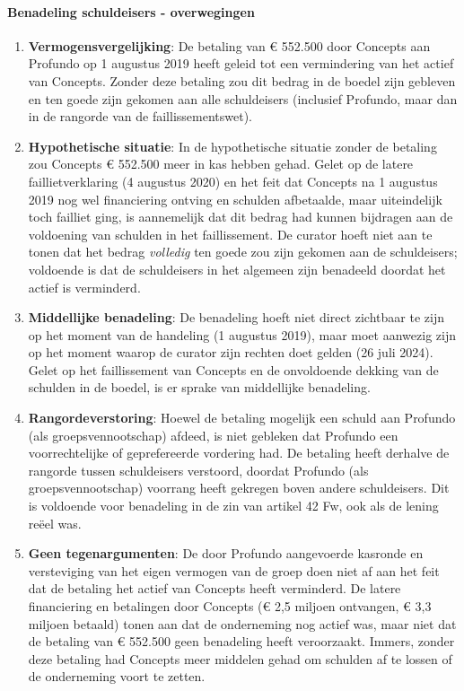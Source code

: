 \documentclass[
  dutch,
  a4paper,
]{article}
\begin{document}
\paragraph{Benadeling schuldeisers - overwegingen}\label{benadeling-schuldeisers---overwegingen-36}

\begin{enumerate}
\def\labelenumi{\arabic{enumi}.}
\item
  \textbf{Vermogensvergelijking}: De betaling van € 552.500 door Concepts aan Profundo op 1 augustus 2019 heeft geleid tot een vermindering van het actief van Concepts. Zonder deze betaling zou dit bedrag in de boedel zijn gebleven en ten goede zijn gekomen aan alle schuldeisers (inclusief Profundo, maar dan in de rangorde van de faillissementswet).
\item
  \textbf{Hypothetische situatie}: In de hypothetische situatie zonder de betaling zou Concepts € 552.500 meer in kas hebben gehad. Gelet op de latere faillietverklaring (4 augustus 2020) en het feit dat Concepts na 1 augustus 2019 nog wel financiering ontving en schulden afbetaalde, maar uiteindelijk toch failliet ging, is aannemelijk dat dit bedrag had kunnen bijdragen aan de voldoening van schulden in het faillissement. De curator hoeft niet aan te tonen dat het bedrag \emph{volledig} ten goede zou zijn gekomen aan de schuldeisers; voldoende is dat de schuldeisers in het algemeen zijn benadeeld doordat het actief is verminderd.
\item
  \textbf{Middellijke benadeling}: De benadeling hoeft niet direct zichtbaar te zijn op het moment van de handeling (1 augustus 2019), maar moet aanwezig zijn op het moment waarop de curator zijn rechten doet gelden (26 juli 2024). Gelet op het faillissement van Concepts en de onvoldoende dekking van de schulden in de boedel, is er sprake van middellijke benadeling.
\item
  \textbf{Rangordeverstoring}: Hoewel de betaling mogelijk een schuld aan Profundo (als groepsvennootschap) afdeed, is niet gebleken dat Profundo een voorrechtelijke of geprefereerde vordering had. De betaling heeft derhalve de rangorde tussen schuldeisers verstoord, doordat Profundo (als groepsvennootschap) voorrang heeft gekregen boven andere schuldeisers. Dit is voldoende voor benadeling in de zin van artikel 42 Fw, ook als de lening reëel was.
\item
  \textbf{Geen tegenargumenten}: De door Profundo aangevoerde kasronde en versteviging van het eigen vermogen van de groep doen niet af aan het feit dat de betaling het actief van Concepts heeft verminderd. De latere financiering en betalingen door Concepts (€ 2,5 miljoen ontvangen, € 3,3 miljoen betaald) tonen aan dat de onderneming nog actief was, maar niet dat de betaling van € 552.500 geen benadeling heeft veroorzaakt. Immers, zonder deze betaling had Concepts meer middelen gehad om schulden af te lossen of de onderneming voort te zetten.

\end{enumerate}
\end{document}
